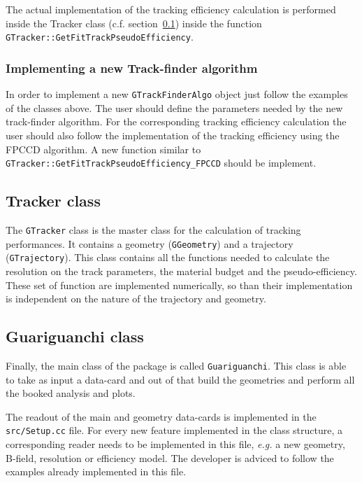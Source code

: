 The actual implementation of the tracking efficiency calculation is performed inside the Tracker class (c.f. section~\ref{subsec:tracker_class}) inside the function {\tt GTracker::GetFitTrackPseudoEfficiency}.

\subsubsection{Implementing a new Track-finder algorithm}

In order to implement a new {\tt GTrackFinderAlgo} object just follow the examples of the classes above. The user should define the parameters needed by the new track-finder algorithm. 
For the corresponding tracking efficiency calculation the user should also follow the implementation of the tracking efficiency using the FPCCD algorithm. A new function similar to 
{\tt GTracker::GetFitTrackPseudoEfficiency\_FPCCD} should be implement.


\subsection{Tracker class}
\label{subsec:tracker_class}

The {\tt GTracker} class is the master class for the calculation of tracking performances. It contains a geometry ({\tt GGeometry}) and a trajectory ({\tt GTrajectory}). This class 
contains all the functions needed to calculate the resolution on the track parameters, the material budget and the pseudo-efficiency. These set of function are implemented numerically,
so than their implementation is independent on the nature of the trajectory and geometry.

\subsection{Guariguanchi class}
\label{subsec:guariguanchi_class}

Finally, the main class of the {\guari} package is called {\tt Guariguanchi}. This class is able to take as input a data-card and out of that build the geometries and perform all the booked 
analysis and plots.

The readout of the main and geometry data-cards is implemented in the {\tt src/Setup.cc} file. For every new feature implemented in the {\guari} class structure, a corresponding reader needs to 
be implemented in this file, {\it e.g.} a new geometry, B-field, resolution or efficiency model. The developer is adviced to follow the examples already implemented in this file.

